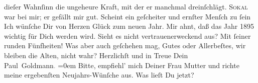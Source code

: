 \begin{ledgroupsized}[t]{13cm}
               dieſer Wahnſinn die ungeheure Kraft, mit der er manchmal dreinſchlägt.\pend
           \pstart
           {\pb}\textsc{Sokal} war bei mir; er
               gefällt mir gut. Scheint ein geſcheiter und ernſter Menſch zu ſein{\dotsfour}\pend
           \pstart
           Ich wünſche Dir von Herzen Glück zum neuen Jahr. Mir ahnt, daß das Jahr
                  1895 wichtig für Dich werden wird. Sieht es nicht vertrauenerweckend
               aus? Mit ſeiner runden Fünfheiten!\pend
           \pstart
           Was aber auch geſchehen mag, Gutes oder Allerbeſtes, wir bleiben die Alten, nicht
               wahr?\pend
           \pstart
           Herzlichſt und in Treue Dein{\\[\baselineskip]}\spacefill\mbox{Paul Goldmann\textcolor{gray}{.}}\pend
           \leftskip=0em{}\pstart
           \noindent{}{\pb}Bitte, empfiehl’ mich Deiner Frau Mutter und richte \label{T_mets_Goldmann_94-partII-22v}\label{T_mets_Goldmann_94-partII-22h} meine ergebenſten Neujahrs-Wünſche aus.\pend
           \pstart
           Was lieſt Du jetzt?\pend
           \endnumbering{}\end{ledgroupsized}  \newcommand{\dateiname}{L02630}\newcommand{\titel}{Paul Goldmann an Arthur Schnitzler, 31. 12. [1894]}\newcommand{\editorInnen}{Martin Anton Müller und Laura Untner}
            \footnotesize
\begin{ledgroupsized}[t]{11.5cm}
\end{ledgroupsized}
         
      